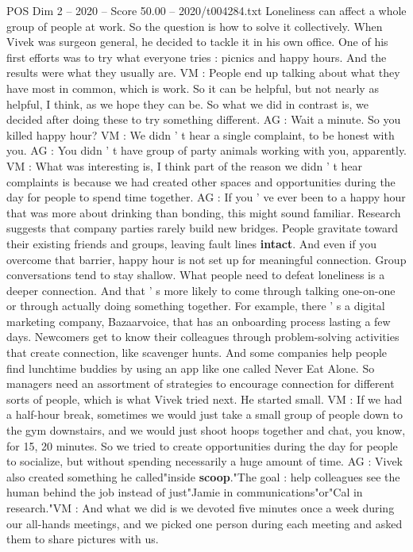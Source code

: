 \begin{textsample}{POS Dim 2 – 2020 – Score 50.00 – 2020/t004284.txt}
Loneliness can affect a whole group of people at work.
So the question is how to solve it collectively.
When Vivek was surgeon general, he decided to tackle it in his own office.
One of his first efforts was to try what everyone tries : picnics and happy hours.
And the results were what they usually are.
VM : People end up talking about what they have most in common, which is work.
So it can be helpful, but not nearly as helpful, I think, as we hope they can be.
So what we did in contrast is, we decided after doing these to try something different.
AG : Wait a minute.
So you killed happy hour?
VM : We didn ' t hear a single complaint, to be honest with you.
AG : You didn ' t have group of party animals working with you, apparently.
VM : What was interesting is, I think part of the reason we didn ' t hear complaints is because we had created other spaces and opportunities during the day for people to spend time together.
AG : If you ' ve ever been to a happy hour that was more about drinking than bonding, this might sound familiar.
Research suggests that company parties rarely build new bridges.
People gravitate toward their existing friends and groups, leaving fault lines \textbf{intact}.
And even if you overcome that barrier, happy hour is not set up for meaningful connection.
Group conversations tend to stay shallow.
What people need to defeat loneliness is a deeper connection.
And that ' s more likely to come through talking one-on-one or through actually doing something together.
For example, there ' s a digital marketing company, Bazaarvoice, that has an onboarding process lasting a few days.
Newcomers get to know their colleagues through problem-solving activities that create connection, like scavenger hunts.
And some companies help people find lunchtime buddies by using an app like one called Never Eat Alone.
So managers need an assortment of strategies to encourage connection for different sorts of people, which is what Vivek tried next.
He started small.
VM : If we had a half-hour break, sometimes we would just take a small group of people down to the gym downstairs, and we would just shoot hoops together and chat, you know, for 15, 20 minutes.
So we tried to create opportunities during the day for people to socialize, but without spending necessarily a huge amount of time.
AG : Vivek also created something he called"inside \textbf{scoop}."The goal : help colleagues see the human behind the job instead of just"Jamie in communications"or"Cal in research."VM : And what we did is we devoted five minutes once a week during our all-hands meetings, and we picked one person during each meeting and asked them to share pictures with us.

\end{textsample}
